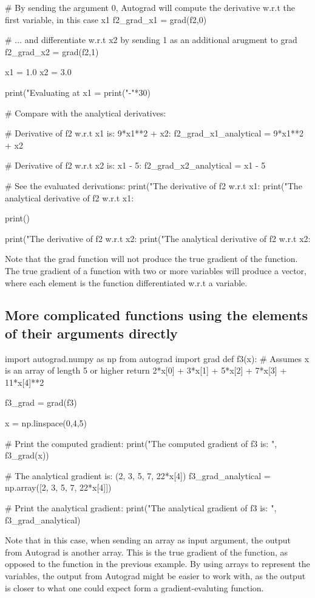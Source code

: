 \documentclass[%
oneside,                 %
final,                   %
10pt]{article}
\begin{document}
# By sending the argument 0, Autograd will compute the derivative w.r.t the first variable, in this case x1
f2_grad_x1 = grad(f2,0)

# ... and differentiate w.r.t x2 by sending 1 as an additional arugment to grad
f2_grad_x2 = grad(f2,1)

x1 = 1.0
x2 = 3.0 

print("Evaluating at x1 = %
print("-"*30)

# Compare with the analytical derivatives:

# Derivative of f2 w.r.t x1 is: 9*x1**2 + x2:
f2_grad_x1_analytical = 9*x1**2 + x2

# Derivative of f2 w.r.t x2 is: x1 - 5:
f2_grad_x2_analytical = x1 - 5

# See the evaluated derivations:
print("The derivative of f2 w.r.t x1: %
print("The analytical derivative of f2 w.r.t x1: %

print()

print("The derivative of f2 w.r.t x2: %
print("The analytical derivative of f2 w.r.t x2: %
\epycod

Note that the grad function will not produce the true gradient of the function. The true gradient of a function with two or more variables will produce a vector, where each element is the function differentiated w.r.t a variable.


\subsection{More complicated functions using the elements of their arguments directly}

\bpycod
import autograd.numpy as np
from autograd import grad
def f3(x): # Assumes x is an array of length 5 or higher
    return 2*x[0] + 3*x[1] + 5*x[2] + 7*x[3] + 11*x[4]**2

f3_grad = grad(f3)

x = np.linspace(0,4,5)

# Print the computed gradient:
print("The computed gradient of f3 is: ", f3_grad(x))

# The analytical gradient is: (2, 3, 5, 7, 22*x[4])
f3_grad_analytical = np.array([2, 3, 5, 7, 22*x[4]])

# Print the analytical gradient:
print("The analytical gradient of f3 is: ", f3_grad_analytical)
\epycod

Note that in this case, when sending an array as input argument, the
output from Autograd is another array. This is the true gradient of
the function, as opposed to the function in the previous example. By
using arrays to represent the variables, the output from Autograd
might be easier to work with, as the output is closer to what one
could expect form a gradient-evaluting function.
\end{document}
